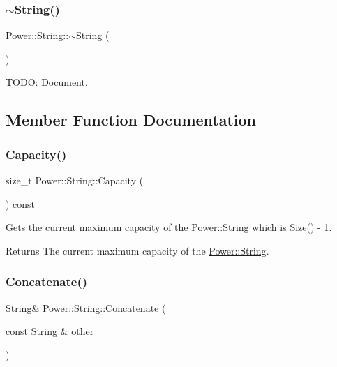 \subsubsection{\texorpdfstring{$\sim$\+String()}{~String()}}
{\footnotesize\ttfamily Power\+::\+String\+::$\sim$\+String (\begin{DoxyParamCaption}{ }\end{DoxyParamCaption})\hspace{0.3cm}{\ttfamily [inline]}}



T\+O\+DO\+: Document. 



\subsection{Member Function Documentation}
\mbox{\label{class_power_1_1_string_aa25a140140cd4fe69b04d70a794c8394}} 
\subsubsection{\texorpdfstring{Capacity()}{Capacity()}}
{\footnotesize\ttfamily size\+\_\+t Power\+::\+String\+::\+Capacity (\begin{DoxyParamCaption}{ }\end{DoxyParamCaption}) const\hspace{0.3cm}{\ttfamily [inline]}}



Gets the current maximum capacity of the \hyperlink{class_power_1_1_string}{Power\+::\+String} which is \hyperlink{class_power_1_1_string_aa62245fcf9bd8261b4b13c558dc45daf}{Size()} -\/ 1. 

\begin{DoxyReturn}{Returns}
The current maximum capacity of the \hyperlink{class_power_1_1_string}{Power\+::\+String}. 
\end{DoxyReturn}
\mbox{\label{class_power_1_1_string_aca4d6272dba914cf0fa66b69e615d0ab}} 
\subsubsection{\texorpdfstring{Concatenate()}{Concatenate()}\hspace{0.1cm}{\footnotesize\ttfamily [1/4]}}
{\footnotesize\ttfamily \hyperlink{class_power_1_1_string}{String}\& Power\+::\+String\+::\+Concatenate (\begin{DoxyParamCaption}\item[{const \hyperlink{class_power_1_1_string}{String} \&}]{other }\end{DoxyParamCaption})\hspace{0.3cm}{\ttfamily [inline]}}



